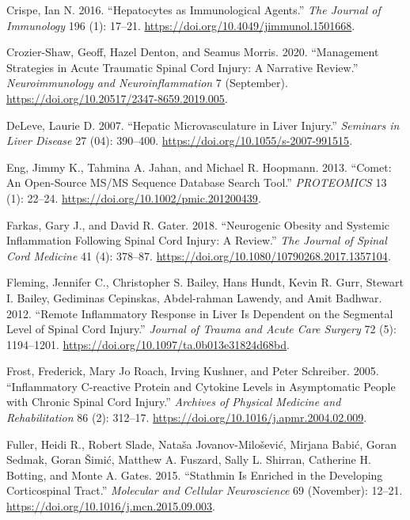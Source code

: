 \documentclass[
]{article}
\newlength{\cslhangindent}
\newlength{\cslentryspacingunit} %
\newenvironment{CSLReferences}[2] %
 {%
  \setlength{\parindent}{0pt}
  \ifodd #1
  \let\oldpar\par
  \def\par{\hangindent=\cslhangindent\oldpar}
  \fi
  \setlength{\parskip}{#2\cslentryspacingunit}
 }%
 {}
\begin{document}
\begin{landscape}
\begin{landscape}
\begin{CSLReferences}{1}{0}
\leavevmode{}%
Crispe, Ian N. 2016. {``Hepatocytes as {Immunological Agents}.''} \emph{The Journal of Immunology} 196 (1): 17--21. \url{https://doi.org/10.4049/jimmunol.1501668}.

\leavevmode{}%
Crozier-Shaw, Geoff, Hazel Denton, and Seamus Morris. 2020. {``Management Strategies in Acute Traumatic Spinal Cord Injury: A Narrative Review.''} \emph{Neuroimmunology and Neuroinflammation} 7 (September). \url{https://doi.org/10.20517/2347-8659.2019.005}.

\leavevmode{}%
DeLeve, Laurie D. 2007. {``Hepatic {Microvasculature} in {Liver Injury}.''} \emph{Seminars in Liver Disease} 27 (04): 390--400. \url{https://doi.org/10.1055/s-2007-991515}.

\leavevmode{}%
Eng, Jimmy K., Tahmina A. Jahan, and Michael R. Hoopmann. 2013. {``Comet: {An} Open-Source {MS}/{MS} Sequence Database Search Tool.''} \emph{PROTEOMICS} 13 (1): 22--24. \url{https://doi.org/10.1002/pmic.201200439}.

\leavevmode{}%
Farkas, Gary J., and David R. Gater. 2018. {``Neurogenic Obesity and Systemic Inflammation Following Spinal Cord Injury: {A} Review.''} \emph{The Journal of Spinal Cord Medicine} 41 (4): 378--87. \url{https://doi.org/10.1080/10790268.2017.1357104}.

\leavevmode{}%
Fleming, Jennifer C., Christopher S. Bailey, Hans Hundt, Kevin R. Gurr, Stewart I. Bailey, Gediminas Cepinskas, Abdel-rahman Lawendy, and Amit Badhwar. 2012. {``Remote Inflammatory Response in Liver Is Dependent on the Segmental Level of Spinal Cord Injury.''} \emph{Journal of Trauma and Acute Care Surgery} 72 (5): 1194--1201. \url{https://doi.org/10.1097/ta.0b013e31824d68bd}.

\leavevmode{}%
Frost, Frederick, Mary Jo Roach, Irving Kushner, and Peter Schreiber. 2005. {``Inflammatory {C-reactive} Protein and Cytokine Levels in Asymptomatic People with Chronic Spinal Cord Injury.''} \emph{Archives of Physical Medicine and Rehabilitation} 86 (2): 312--17. \url{https://doi.org/10.1016/j.apmr.2004.02.009}.

\leavevmode{}%
Fuller, Heidi R., Robert Slade, Nataša Jovanov-Milošević, Mirjana Babić, Goran Sedmak, Goran Šimić, Matthew A. Fuszard, Sally L. Shirran, Catherine H. Botting, and Monte A. Gates. 2015. {``Stathmin Is Enriched in the Developing Corticospinal Tract.''} \emph{Molecular and Cellular Neuroscience} 69 (November): 12--21. \url{https://doi.org/10.1016/j.mcn.2015.09.003}.


\end{CSLReferences}
\end{landscape}
\end{landscape}
\end{document}
